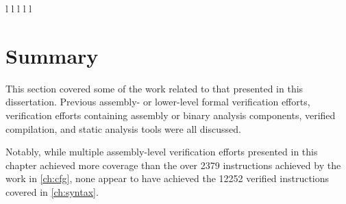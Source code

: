\begin{table*}
\begin{tabular}{l l l l l}
    \bottomrule
  \end{tabular}
\end{table*}

\section{Summary}
This section covered some of the work related to that presented in this dissertation.
Previous assembly- or lower-level formal verification efforts,
verification efforts containing assembly or binary analysis components,
verified compilation, and static analysis tools were all discussed.

Notably, while multiple assembly-level verification efforts
presented in this chapter achieved more coverage
than the over \num{2379} instructions achieved by the work in \cref{ch:cfg},
none appear to have achieved the \num{12252}
verified instructions covered in \cref{ch:syntax}.
